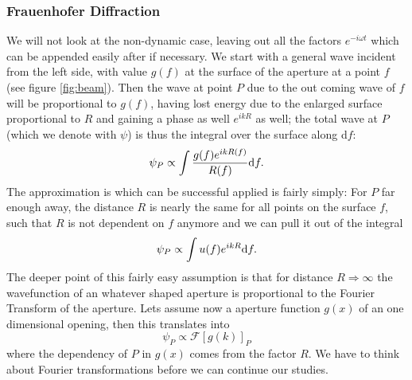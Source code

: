 \subsubsection{Frauenhofer Diffraction} 
We will not look at the non-dynamic case, leaving out all the factors $e^{-i\omega t}$ which can be appended
easily after if necessary. We start with a general wave incident from the left side, with value $g(f)$ at the
surface of the aperture at a point $f$ (see figure \ref{fig:beam}). Then the wave at point $P$ due to the
out coming wave of $f$ will
be proportional to $g(f)$, having lost
energy due to the enlarged surface proportional to $R$ and gaining a phase as well $e^{ikR}$ as well; 
the total wave at $P$ (which we denote with $\psi$) is thus the integral over the surface along d$f$: 
\begin{equation}
    \label{eq:int1}
    \psi_P \propto \int \frac{g(f) e^{ikR(f)}}{R(f)}\mathrm{d} f.
\end{equation}
The approximation is which can be successful applied is fairly simply: For $P$ far enough away, the distance
$R$ is nearly the same for all points on the surface $f$, such that $R$ is not dependent on $f$ anymore and
we can pull it out of the integral
\begin{equation}
    \label{eq:int1}
    \psi_P \propto \int u(f) e^{ikR}\mathrm{d} f.
\end{equation}
The deeper point of this fairly easy assumption is that for distance $R \Rightarrow \infty$ the wavefunction
of an whatever shaped aperture is proportional to the Fourier Transform of the aperture. Lets assume
now a aperture function $g(x)$ of an one dimensional opening, then this translates into
\begin{equation}
    \psi_P \propto \mathcal{F} \left[g(k)\right ]_P
\end{equation}
where the dependency of $P$ in $g(x)$ comes from the factor $R$.
We have to think about Fourier transformations before we can continue our studies.

